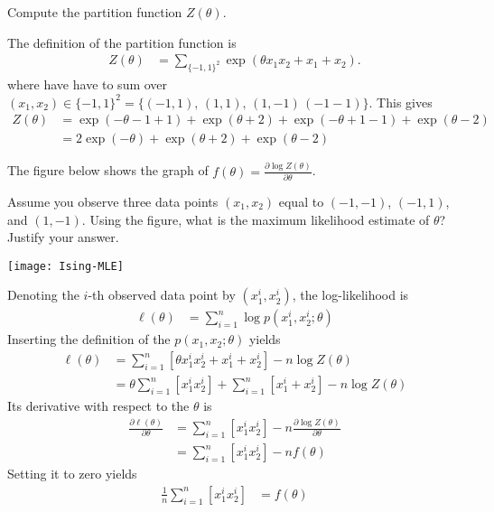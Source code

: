 \begin{exenumerate}
\item Compute the partition function $Z(\theta)$.

  \begin{solution}
    The definition of the partition function is
    \begin{align}
      Z(\theta) & = \sum_{ \{-1,1\}^2} \exp\left(\theta x_1 x_2+x_1+x_2\right).
    \end{align}
    where have have to sum over $(x_1,x_2) \in  \{-1,1\}^2 = \{ (-1,1),\, (1,1),\, (1,-1)\, (-1-1)\}$. This gives
    \begin{align}
      Z(\theta) & = \exp(-\theta-1+1)+\exp(\theta+2)+\exp(-\theta+1-1)+\exp(\theta-2)\\
      & = 2\exp(-\theta)+\exp(\theta+2)+\exp(\theta-2)
    \end{align}

  \end{solution}
  
\item The figure below shows the graph of $f(\theta)= \frac{\partial \log Z(\theta)}{\partial \theta}$.\vspace{1ex}

  Assume you observe three data points $(x_1, x_2)$ equal to
  $(-1,-1)$, $(-1,1)$, and $(1,-1)$. Using the figure, what is the
  maximum likelihood estimate of $\theta$? Justify your answer. 
    
\begin{center}
  \texttt{[image: Ising-MLE]}
\end{center}

  \begin{solution}

    Denoting the $i$-th observed data point by $(x_1^i,x_2^i)$,
    the log-likelihood is
    \begin{align}
      \ell(\theta) & = \sum_{i=1}^n \log p(x_1^i,x_2^i; \theta)
    \end{align}
    Inserting the definition of the $p(x_1,x_2;\theta)$ yields
    \begin{align}
      \ell(\theta)  & = \sum_{i=1}^n \left[ \theta x_1^i x_2^i+x_1^i+x_2^i \right] - n \log Z(\theta)\\
      &= \theta \sum_{i=1}^n \left[x_1^i x_2^i\right] + \sum_{i=1}^n \left[x_1^i+x_2^i \right] - n\log Z(\theta)
    \end{align}
    Its derivative with respect to the $\theta$ is
    \begin{align}
      \frac{\partial \ell(\theta)}{\partial \theta} & =  \sum_{i=1}^n \left[x_1^i x_2^i\right] - n  \frac{\partial \log Z(\theta)}{\partial \theta}\\
      & =  \sum_{i=1}^n \left[x_1^i x_2^i\right] - n f(\theta)
    \end{align}
    Setting it to zero yields
    \begin{align}
      \frac{1}{n}  \sum_{i=1}^n \left[x_1^i x_2^i\right] &= f(\theta)
    \end{align}


\end{solution}
\end{exenumerate}
